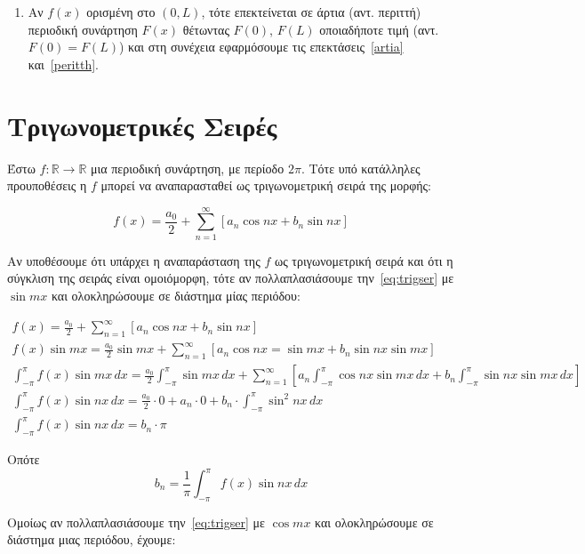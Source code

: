 \begin{enumerate}
    \item Αν $ f(x) $ ορισμένη στο $ (0,L) $, τότε επεκτείνεται σε 
        άρτια (αντ. περιττή) περιοδική συνάρτηση $ F(x) $ θέτωντας $ F(0) $, 
        $ F(L) $ οποιαδήποτε τιμή (αντ. $F(0)=F(L)$) και στη συνέχεια εφαρμόσουμε 
        τις επεκτάσεις~\ref{artia} και~\ref{peritth}.
\end{enumerate}


\section{Τριγωνομετρικές Σειρές}

Έστω $ f \colon \mathbb{R} \to \mathbb{R} $ μια περιοδική συνάρτηση, με περίοδο 
$ 2 \pi $. Τότε υπό κατάλληλες προυποθέσεις η $f$ μπορεί να αναπαρασταθεί ως 
\textcolor{Col1}{τριγωνομετρική} σειρά της μορφής:

\begin{equation}\label{eq:trigser}
    f(x) = \frac{a_{0}}{2} + \sum_{n=1}^{\infty} [a_{n} \cos{nx}  + b_{n} \sin{nx}]
\end{equation} 

Αν υποθέσουμε ότι υπάρχει η αναπαράσταση της $f$ ως τριγωνομετρική σειρά και ότι 
η σύγκλιση της σειράς είναι ομοιόμορφη, τότε αν πολλαπλασιάσουμε την~\eqref{eq:trigser}
με $ \sin{mx} $ και ολοκληρώσουμε σε διάστημα μίας περιόδου: 

\begin{gather*}
    f(x) = \frac{a_{0}}{2} + \sum_{n=1}^{\infty} [a_{n} \cos{nx} + b_{n} \sin{nx}]  \\
    f(x) \sin{mx} = \frac{a_{0}}{2} \sin{mx} + \sum_{n=1}^{\infty} 
    [a_{n} \cos{nx} = \sin{mx} + b_{n} \sin{nx} \sin{mx}]   \\
    \int _{- \pi} ^{\pi} f(x) \sin{mx} \,{dx} = \frac{a_{0}}{2} \int _{- \pi}^{\pi} 
    \sin{mx} \,{dx} + \sum_{n=1}^{\infty} [a_{n} \int _{- \pi}^{\pi}
    \cos{nx} \sin{mx}  \,{dx} + b_{n} \int _{- \pi }^{\pi} \sin{nx} \sin{mx} \,{dx}] \\
    \int _{- \pi }^{\pi} f(x) \sin{nx} \,{dx} = \frac{a_{0}}{2} \cdot 0 + 
    a_{n}\cdot 0 + b_{n} \cdot \int _{- \pi}^{\pi } \sin^{2}{nx} \,{dx} \\
    \int _{- \pi }^{\pi} f(x) \sin{nx} \,{dx} =  b_{n} \cdot \pi 
\end{gather*}   

Οπότε 
\[
    \boxed{b_{n} = \frac{1}{\pi} \int _{- \pi }^{\pi} f(x) \sin{nx} \,{dx}}
\] 

Ομοίως αν πολλαπλασιάσουμε την~\eqref{eq:trigser} με $ \cos{mx} $ και ολοκληρώσουμε 
σε διάστημα μιας περιόδου, έχουμε:

